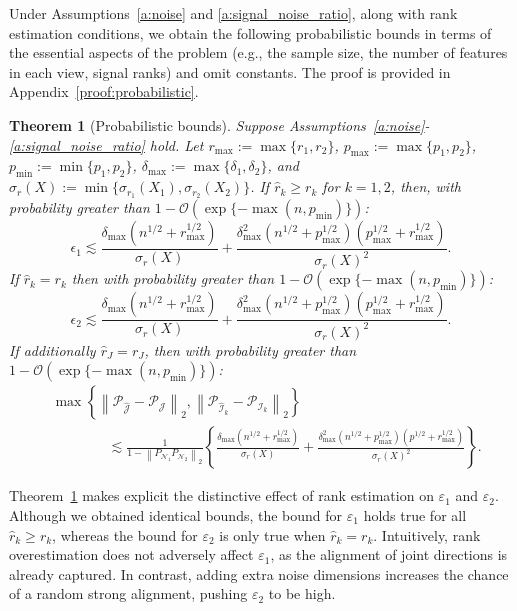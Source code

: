\documentclass{amsart}
\newcommand{\Ncal}{\mathcal{N}}
\newcommand{\Jcal}{\mathcal{J}}
\newcommand{\Ical}{\mathcal{I}}
\newtheorem{theorem}{Theorem}[section]
\begin{document}
{Under Assumptions~\ref{a:noise} and \ref{a:signal_noise_ratio}, along with rank estimation conditions, we obtain the following probabilistic bounds in terms of the essential aspects of the problem (e.g., the sample size, the number of features in each view, signal ranks) and omit constants. The proof is provided in Appendix~\ref{proof:probabilistic}.
\begin{theorem}[Probabilistic bounds] Suppose Assumptions~\ref{a:noise}-\ref{a:signal_noise_ratio} hold. Let $r_{\max} := \max\{r_1,r_2\}$,  $p_{\max}:= \max\{p_1,p_2\}$, $p_{\min}:= \min\{p_1,p_2\}$, $\delta_{\max}:= \max\{\delta_1,\delta_2\}$, and $\sigma_r(X):= \min\{\sigma_{r_1}(X_1),\sigma_{r_2}(X_2)\}$. If $\widehat r_k \geq r_k$ for $k = 1,2$, then, with probability greater than $1-\mathcal{O}(\exp\{{-\max(n,p_{\min})}\})$:
$$\epsilon_1\lesssim \frac{\delta_{\max}(n^{1/2}+r_{\max}^{1/2})}{\sigma_{r}(X)} + \frac{\delta_{\max}^2(n^{1/2}+p_{\max}^{1/2})(p_{\max}^{1/2}+r_{\max}^{1/2})}{\sigma_{r}(X)^2}.$$
If $\widehat r_k = r_k$  then with probability greater than $1-\mathcal{O}(\exp\{-\max(n,p_{\min})\})$:
$$
\epsilon_2 \lesssim  \frac{\delta_{\max}(n^{1/2}+r_{\max}^{1/2})}{\sigma_{r}(X)} + \frac{\delta_{\max}^2(n^{1/2}+p_{\max}^{1/2})(p_{\max}^{1/2}+r_{\max}^{1/2})}{\sigma_{r}(X)^2}.$$
If additionally $\widehat r_J = r_J$, then with probability greater than $1-\mathcal{O}(\exp\{-\max(n,p_{\min})\})$:
\begin{align*}
&\max\left\{\left\|\mathcal{P}_{\widehat{\Jcal}}-\mathcal{P}_{{\Jcal}}\right\|_2,\left\|\mathcal{P}_{\widehat{\Ical}_k}-\mathcal{P}_{{\Ical}_k}\right\|_2\right\}\\
&\quad\quad\quad\quad \lesssim  
\frac{1}{1-\left\|P_{\Ncal_1} P_{\Ncal_2}\right\|_2}\left\{ \frac{\delta_{\max}(n^{1/2}+r_{\max}^{1/2})}{\sigma_{r}(X)} + \frac{\delta_{\max}^2(n^{1/2}+p_{\max}^{1/2})(p^{1/2}+r_{\max}^{1/2})}{\sigma_{r}(X)^2}\right\}.
\end{align*}

\label{thm:probabilistic}
\end{theorem}

Theorem~\ref{thm:probabilistic} makes explicit the distinctive effect of rank estimation on $\varepsilon_1$ and $\varepsilon_2$. Although we obtained identical bounds, the bound for $\varepsilon_1$ holds true for all $\widehat r_k \geq r_k$, whereas the bound for $\varepsilon_2$ is only true when $\widehat r_k = r_k$. Intuitively, rank overestimation does not adversely affect $\varepsilon_1$, as the alignment of joint directions is already captured. In contrast, adding extra noise dimensions increases the chance of a random strong alignment, pushing $\varepsilon_2$ to be high.

}
\end{document}
